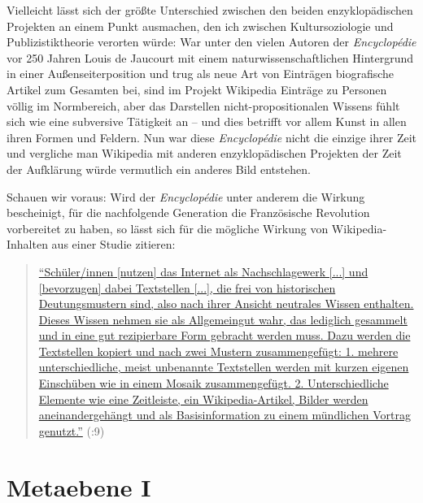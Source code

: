 \documentclass[fontsize=12pt]{scrartcl}
\begin{document}
Vielleicht l\"asst sich der gr\"o{\ss}te Unterschied zwischen den beiden enzyklop\"adischen Projekten an einem Punkt ausmachen, den ich zwischen Kultursoziologie und Pu\-bli\-zistiktheorie verorten w\"urde: War unter den vielen Autoren\textsuperscript{\tiny *} der \textit{Encyclop\'{e}die} vor 250 Jah\-ren Louis de Jaucourt mit einem naturwissenschaftlichen Hintergrund in einer Au{\ss}enseiter\textsuperscript{\tiny *}position und trug als neue Art von Eintr\"agen biografische Artikel zum Gesamten bei, sind im Projekt Wi\-ki\-pe\-dia Eintr\"age zu Per\-so\-nen v\"ollig im Normbe\-reich, aber das Dar\-stel\-len nicht-pro\-po\-si\-ti\-o\-na\-len Wissens f\"uhlt sich wie eine subversive T\"atigkeit an -- und dies betrifft vor allem Kunst in allen ihren Formen und Feldern. Nun war diese \textit{Encyclop\'{e}die} nicht die einzige ihrer Zeit und vergliche man Wi\-ki\-pe\-dia mit anderen enzyklop\"adischen Projekten der Zeit der Aufkl\"arung w\"urde vermutlich ein anderes Bild entstehen.

Schauen wir voraus: Wird der \textit{Encyclop\'{e}die} unter anderem die Wirkung bescheinigt, f\"ur die nachfolgende Generation die Franz\"osische Revolution vorbereitet zu haben, so l\"asst sich f\"ur die m\"ogliche Wirkung von Wi\-ki\-pe\-dia-Inhalten aus einer Studie zitieren: 

\singlespacing
\begin{quote}
\href{http://www.degruyter.com/view/books/9783486858662/9783486858662-002/9783486858662-002.xml}{"`Sch\"uler/innen [nutzen] das Internet als Nachschlagewerk [...] und [be\-vor\-zu\-gen] dabei Textstellen [...], die frei von historischen Deu\-tungs\-mus\-tern sind, also nach ihrer Ansicht \flq neutrales Wissen\frq\,\,enthalten. Dieses Wissen nehmen sie als Allgemeingut wahr, das lediglich gesammelt und in eine gut rezipierbare Form gebracht werden muss. Dazu werden die Textstellen kopiert und nach zwei Mustern zusammengef\"ugt: 1. meh\-rere unterschied\-liche, meist unbenannte Textstellen werden mit kurzen eigenen Ein\-sch\"u\-ben wie in einem Mosaik zusammengef\"ugt. 2. Unterschiedliche Elemente wie eine Zeitleiste, ein Wi\-ki\-pe\-dia-Artikel, Bilder werden an\-ein\-an\-der\-ge\-h\"angt und als Basisinformation zu einem m\"und\-li\-chen Vortrag genutzt."'} (\cite{Alavi2015}:9)
\end{quote}
\onehalfspacing
 
\pagebreak

\section{Metaebene I}
\label{sec:5}
\end{document}
